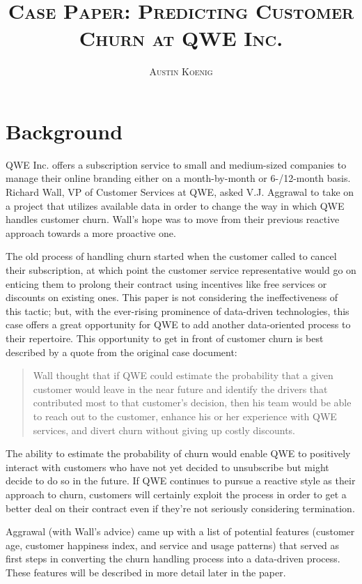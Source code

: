 \documentclass{article}
\title{\vspace{-2cm}\textsc{Case Paper: Predicting Customer Churn at QWE Inc.}}
\author{\textsc{Austin Koenig}}
\date{}
\begin{document}
	\maketitle
	\section{Background}
	
	QWE Inc. offers a subscription service to small and medium-sized companies to manage their online branding either on a month-by-month or 6-/12-month basis. Richard Wall, VP of Customer Services at QWE, asked V.J. Aggrawal to take on a project that utilizes available data in order to change the way in which QWE handles customer churn. Wall’s hope was to move from their previous reactive approach towards a more proactive one.
	
	The old process of handling churn started when the customer called to cancel their subscription, at which point the customer service representative would go on enticing them to prolong their contract using incentives like free services or discounts on existing ones. This paper is not considering the ineffectiveness of this tactic; but, with the ever-rising prominence of data-driven technologies, this case offers a great opportunity for QWE to add another data-oriented process to their repertoire. This opportunity to get in front of customer churn is best described by a quote from the original case document:
	
	\begin{quote}
		Wall thought that if QWE could estimate the probability that a given customer would leave in the near future and identify the drivers that contributed most to that customer’s decision, then his team would be able to reach out to the customer, enhance his or her experience with QWE services, and divert churn without giving up costly discounts.
	\end{quote}
	
	The ability to estimate the probability of churn would enable QWE to positively interact with customers who have not yet decided to unsubscribe but might decide to do so in the future. If QWE continues to pursue a reactive style as their approach to churn, customers will certainly exploit the process in order to get a better deal on their contract even if they’re not seriously considering termination.
	
	Aggrawal (with Wall’s advice) came up with a list of potential features (customer age, customer happiness index, and service and usage patterns) that served as first steps in converting the churn handling process into a data-driven process. These features will be described in more detail later in the paper.
	
\end{document}
